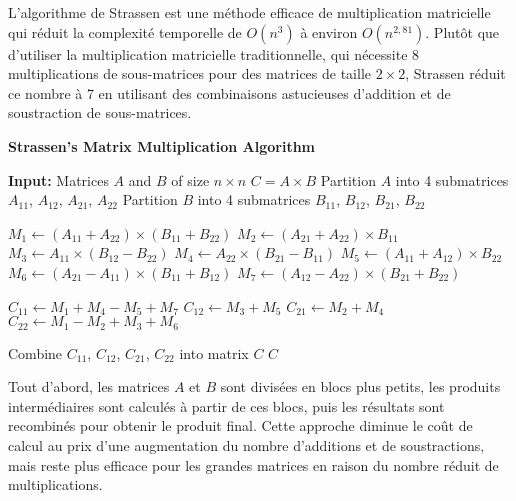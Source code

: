 \documentclass[../CSC_5RO06_TA.tex]{subfiles}
\begin{document}
L'algorithme de Strassen est une méthode efficace de multiplication matricielle qui réduit la complexité temporelle de $O(n^3)$ à environ $O(n^{2,81})$. Plutôt que d'utiliser la multiplication matricielle traditionnelle, qui nécessite 8 multiplications de sous-matrices pour des matrices de taille $2 \times 2$, Strassen réduit ce nombre à 7 en utilisant des combinaisons astucieuses d'addition et de soustraction de sous-matrices.\\

\begin{algorithm}
\caption{\textbf{Strassen's Matrix Multiplication Algorithm}}
\begin{algorithmic}[1]
    \State \textbf{Input:} Matrices $A$ and $B$ of size $n \times n$
        \State \Return $C = A \times B$
    \Else
        \State Partition $A$ into 4 submatrices $A_{11}$, $A_{12}$, $A_{21}$, $A_{22}$
        \State Partition $B$ into 4 submatrices $B_{11}$, $B_{12}$, $B_{21}$, $B_{22}$
        
        \State $M_1 \gets (A_{11} + A_{22}) \times (B_{11} + B_{22})$
        \State $M_2 \gets (A_{21} + A_{22}) \times B_{11}$
        \State $M_3 \gets A_{11} \times (B_{12} - B_{22})$
        \State $M_4 \gets A_{22} \times (B_{21} - B_{11})$
        \State $M_5 \gets (A_{11} + A_{12}) \times B_{22}$
        \State $M_6 \gets (A_{21} - A_{11}) \times (B_{11} + B_{12})$
        \State $M_7 \gets (A_{12} - A_{22}) \times (B_{21} + B_{22})$

        \State $C_{11} \gets M_1 + M_4 - M_5 + M_7$
        \State $C_{12} \gets M_3 + M_5$
        \State $C_{21} \gets M_2 + M_4$
        \State $C_{22} \gets M_1 - M_2 + M_3 + M_6$

        \State Combine $C_{11}$, $C_{12}$, $C_{21}$, $C_{22}$ into matrix $C$
    \EndIf
    \State \Return $C$
\end{algorithmic}
\end{algorithm}

Tout d'abord, les matrices $A$ et $B$ sont divisées en blocs plus petits, les produits intermédiaires sont calculés à partir de ces blocs, puis les résultats sont recombinés pour obtenir le produit final. Cette approche diminue le coût de calcul au prix d'une augmentation du nombre d'additions et de soustractions, mais reste plus efficace pour les grandes matrices en raison du nombre réduit de multiplications.
\end{document}
